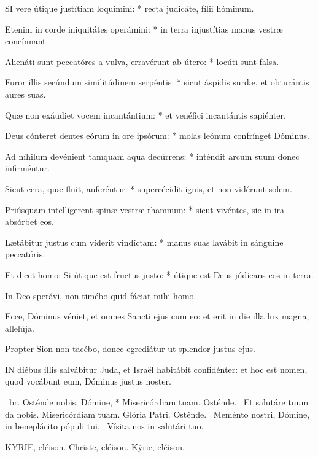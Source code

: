 \lettrine[lines=2]{S}{I} vere útique justítiam loquímini: * recta judicáte, fílii hóminum.

Etenim in corde iniquitátes operámini: * in terra injustítias manus vestræ concínnant.

Alienáti sunt peccatóres a vulva, erravérunt ab útero: * locúti sunt falsa.

Furor illis secúndum similitúdinem serpéntis: * sicut áspidis surdæ, et obturántis aures suas.

Quæ non exáudiet vocem incantántium: * et venéfici incantántis sapiénter.

Deus cónteret dentes eórum in ore ipsórum: * molas leónum confrínget Dóminus.

Ad níhilum devénient tamquam aqua decúrrens: * inténdit arcum suum donec infirméntur.

Sicut cera, quæ fluit, auferéntur: * supercécidit ignis, et non vidérunt solem.

Priúsquam intellígerent spinæ vestræ rhamnum: * sicut vivéntes, sic in ira absórbet eos.

Lætábitur justus cum víderit vindíctam: * manus suas lavábit in sánguine peccatóris.

Et dicet homo: Si útique est fructus justo: * útique est Deus júdicans eos in terra.

  In Deo sperávi, non timébo quid fáciat mihi homo.


  Ecce, Dóminus véniet, et omnes Sancti ejus cum eo: et erit in die illa lux magna, allelúja.

  Propter Sion non tacébo, donec egrediátur ut splendor justus ejus.


\lettrine[lines=2]{I}{N} diébus illis salvábitur Juda, et Israël habitábit confidénter: et hoc est nomen, quod vocábunt eum, Dóminus justus noster.

\R\ br. Osténde nobis, Dómine, * Misericórdiam tuam. Osténde. \V\ Et salutáre tuum da nobis. Misericórdiam tuam. Glória Patri. Osténde. \V\ Meménto nostri, Dómine, in beneplácito pópuli tui. \R\ Vísita nos in salutári tuo.


KYRIE, eléison. Christe, eléison. Kýrie, eléison.


